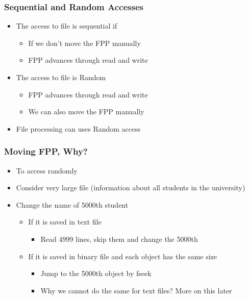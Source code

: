 \documentclass{../c-lecture}
\begin{document}
\begin{frame}
  \frametitle{Sequential and Random Accesses}
  \begin{itemize}
    \item The access to file is sequential if
    \begin{itemize}
      \item If we don’t move the FPP manually
      \item FPP advances through read and write
    \end{itemize}
    \item The access to file is Random
    \begin{itemize}
      \item FPP advances through read and write
      \item We can also move the FPP manually
    \end{itemize}
    \item File processing can uses Random access
  \end{itemize}
\end{frame}

\begin{frame}
  \frametitle{Moving FPP, Why?}
  \begin{itemize}
    \item To access randomly
    \item
      Consider very large file (information about all students in the
      university)
    \item Change the name of 5000th student
    \begin{itemize}
      \item If it is saved in text file
      \begin{itemize}
        \item Read 4999 lines, skip them and change the 5000th
      \end{itemize}
      \item If it is saved in binary file and each object has the same size
      \begin{itemize}
        \item Jump to the 5000th object by fseek
        \item Why we cannot do the same for text files? More on this later
      \end{itemize}
    \end{itemize}
  \end{itemize}
\end{frame}
\end{document}
